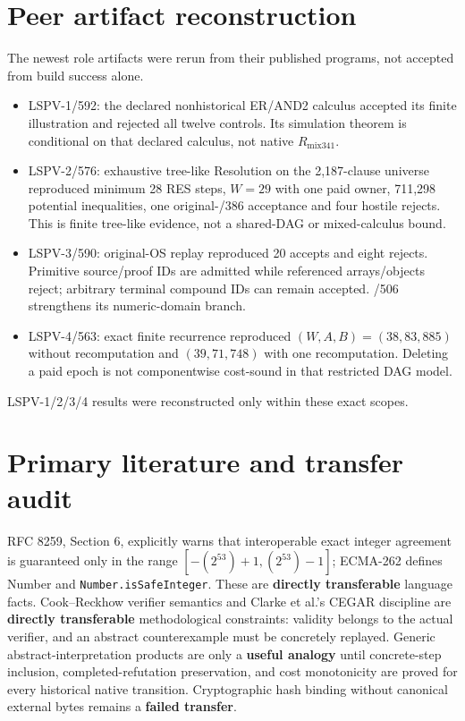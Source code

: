 \documentclass[11pt]{article}
\begin{document}
\section{Peer artifact reconstruction}
The newest role artifacts were rerun from their published programs, not accepted from build success alone.
\begin{itemize}
\item LSPV-1/592: the declared nonhistorical ER/AND2 calculus accepted its finite illustration and rejected all twelve controls.  Its simulation theorem is conditional on that declared calculus, not native $R_{\mathrm{mix341}}$.
\item LSPV-2/576: exhaustive tree-like Resolution on the 2,187-clause universe reproduced minimum 28 RES steps, $W=29$ with one paid owner, 711,298 potential inequalities, one original-/386 acceptance and four hostile rejects.  This is finite tree-like evidence, not a shared-DAG or mixed-calculus bound.
\item LSPV-3/590: original-OS replay reproduced 20 accepts and eight rejects.  Primitive source/proof IDs are admitted while referenced arrays/objects reject; arbitrary terminal compound IDs can remain accepted.  /506 strengthens its numeric-domain branch.
\item LSPV-4/563: exact finite recurrence reproduced $(W,A,B)=(38,83,885)$ without recomputation and $(39,71,748)$ with one recomputation.  Deleting a paid epoch is not componentwise cost-sound in that restricted DAG model.
\end{itemize}
LSPV-1/2/3/4 results were reconstructed only within these exact scopes.

\section{Primary literature and transfer audit}
RFC 8259, Section 6, explicitly warns that interoperable exact integer agreement is guaranteed only in the range $[-(2^{53})+1,(2^{53})-1]$; ECMA-262 defines Number and \texttt{Number.isSafeInteger}.  These are \textbf{directly transferable} language facts.  Cook--Reckhow verifier semantics and Clarke et al.'s CEGAR discipline are \textbf{directly transferable} methodological constraints: validity belongs to the actual verifier, and an abstract counterexample must be concretely replayed.  Generic abstract-interpretation products are only a \textbf{useful analogy} until concrete-step inclusion, completed-refutation preservation, and cost monotonicity are proved for every historical native transition.  Cryptographic hash binding without canonical external bytes remains a \textbf{failed transfer}.
\end{document}
